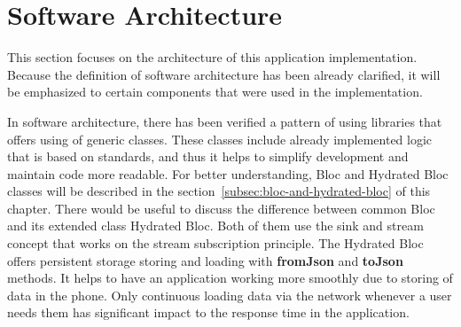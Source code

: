 \section{Software Architecture}\label{sec:software-architecture}
This section focuses on the architecture of this application implementation.
Because the definition of software architecture has been already clarified, it will be emphasized to certain components that were used in the implementation.

In software architecture, there has been verified a pattern of using libraries that offers using of generic classes.
These classes include already implemented logic that is based on standards, and thus it helps to simplify development and maintain code more readable.
For better understanding, Bloc and Hydrated Bloc classes will be described in the section~\ref{subsec:bloc-and-hydrated-bloc} of this chapter.
\newpage
There would be useful to discuss the difference between common Bloc and its extended class Hydrated Bloc.
Both of them use the sink and stream concept that works on the stream subscription principle.
The Hydrated Bloc offers persistent storage storing and loading with \textbf{fromJson} and \textbf{toJson} methods.
It helps to have an application working more smoothly due to storing of data in the phone.
Only continuous loading data via the network whenever a user needs them has significant impact to the response time in the application.









